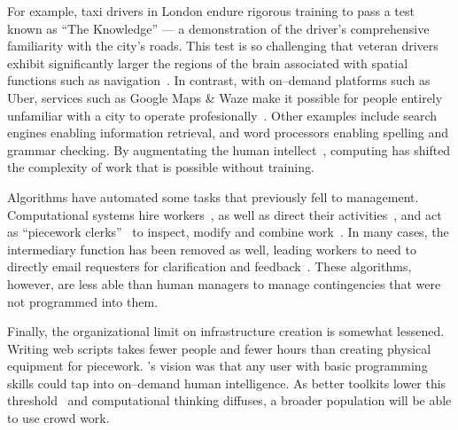 \documentclass[trackingWork]{subfiles}
\begin{document}
For example, taxi drivers in London endure rigorous training to pass a test known as ``The Knowledge''
--- a demonstration of the driver's comprehensive familiarity with the city's roads.
This test is so challenging that veteran drivers exhibit significantly larger
the regions of the brain associated with spatial functions such as navigation~\cite{Maguire11042000,Maguire2894,Skok:1999:KML:299513.299625,
      skok2000managing,Woollett1407,woollett2011acquiring}.
In contrast, with on--demand platforms such as Uber, services such as Google Maps \& Waze make it possible for
people entirely unfamiliar with a city
to operate profesionally~\cite{silva2013traffic,hind2014outsmarting}.
Other examples include search engines enabling information retrieval, and word processors enabling spelling and grammar checking.
By augmentating the human intellect~\cite{engelbart2001augmenting}, computing has shifted the complexity of work that is possible without training.

Algorithms have automated some tasks that previously fell to management.
Computational systems hire workers~\cite{turkitLittle,weld2010decision}, as well as direct their activities~\cite{uberAlgorithm}, and act as ``piecework clerks''~\cite{10.2307/23702539} to inspect, modify and combine work~\cite{turkopticon,takingAHITMcInnis}.
In many cases, the intermediary function has been removed as well, leading workers to need to directly email requesters for clarification and feedback~\cite{martin2014being}.
These algorithms, however, are less able than human managers to manage contingencies that were not programmed into them.

Finally, the organizational limit on infrastructure creation is somewhat lessened. Writing web scripts takes fewer people and fewer hours than creating physical equipment for piecework.
\citeauthor{turkitLittle}'s vision was that any user with basic programming skills could tap into on--demand human intelligence.
As better toolkits lower this threshold~\cite{myers2000past} and computational thinking diffuses, a broader population will be able to use crowd work.
\end{document}
